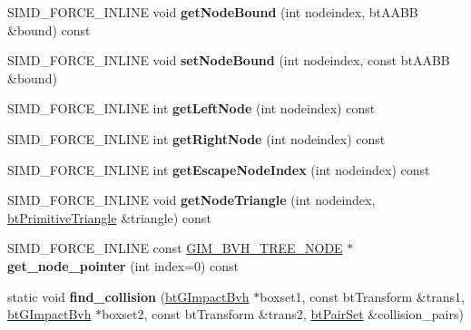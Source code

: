 \begin{DoxyCompactItemize}
\item 
\mbox{\label{classbtGImpactBvh_af517762c805e92b40344901e517d6375}} 
S\+I\+M\+D\+\_\+\+F\+O\+R\+C\+E\+\_\+\+I\+N\+L\+I\+NE void {\bfseries get\+Node\+Bound} (int nodeindex, bt\+A\+A\+BB \&bound) const
\item 
\mbox{\label{classbtGImpactBvh_a859ecdad42780d5eef09f9825f179640}} 
S\+I\+M\+D\+\_\+\+F\+O\+R\+C\+E\+\_\+\+I\+N\+L\+I\+NE void {\bfseries set\+Node\+Bound} (int nodeindex, const bt\+A\+A\+BB \&bound)
\item 
\mbox{\label{classbtGImpactBvh_abd3f4e49eae2c602d3bbdacffdee6afb}} 
S\+I\+M\+D\+\_\+\+F\+O\+R\+C\+E\+\_\+\+I\+N\+L\+I\+NE int {\bfseries get\+Left\+Node} (int nodeindex) const
\item 
\mbox{\label{classbtGImpactBvh_ae7eaa9f96db58dd4e04daaefb0b1f071}} 
S\+I\+M\+D\+\_\+\+F\+O\+R\+C\+E\+\_\+\+I\+N\+L\+I\+NE int {\bfseries get\+Right\+Node} (int nodeindex) const
\item 
\mbox{\label{classbtGImpactBvh_a4cbf39bfbc23194fe4d1c3e9f8206cb9}} 
S\+I\+M\+D\+\_\+\+F\+O\+R\+C\+E\+\_\+\+I\+N\+L\+I\+NE int {\bfseries get\+Escape\+Node\+Index} (int nodeindex) const
\item 
\mbox{\label{classbtGImpactBvh_a6c71b61d76c38653c94d4e3ef3d5fdf7}} 
S\+I\+M\+D\+\_\+\+F\+O\+R\+C\+E\+\_\+\+I\+N\+L\+I\+NE void {\bfseries get\+Node\+Triangle} (int nodeindex, \hyperlink{classbtPrimitiveTriangle}{bt\+Primitive\+Triangle} \&triangle) const
\item 
\mbox{\label{classbtGImpactBvh_afd2e90ddbfcfd48752e984462713c237}} 
S\+I\+M\+D\+\_\+\+F\+O\+R\+C\+E\+\_\+\+I\+N\+L\+I\+NE const \hyperlink{classGIM__BVH__TREE__NODE}{G\+I\+M\+\_\+\+B\+V\+H\+\_\+\+T\+R\+E\+E\+\_\+\+N\+O\+DE} $\ast$ {\bfseries get\+\_\+node\+\_\+pointer} (int index=0) const
\item 
\mbox{\label{classbtGImpactBvh_a1e1856593135ba2a2079018634874bf0}} 
static void {\bfseries find\+\_\+collision} (\hyperlink{classbtGImpactBvh}{bt\+G\+Impact\+Bvh} $\ast$boxset1, const bt\+Transform \&trans1, \hyperlink{classbtGImpactBvh}{bt\+G\+Impact\+Bvh} $\ast$boxset2, const bt\+Transform \&trans2, \hyperlink{classbtPairSet}{bt\+Pair\+Set} \&collision\+\_\+pairs)
\end{DoxyCompactItemize}


